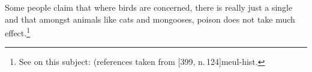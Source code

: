 \begin{translation}
\begin{sloka}
Some people claim that where birds are concerned, there is really just a
single  and that amongst animals like cats and
mongooses, poison does not take much effect.\footnote{See on this
    subject:  \cites[39-40]{brun-1909}[88-89]{mint-1969} (references taken from 
    [399, n.\,124]{meul-hist}.}


\end{sloka}



    
\end{translation}